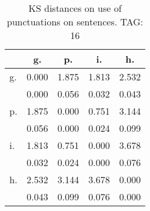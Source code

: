 \begin{table}[h!]
\begin{center}
\begin{tabular}{| l | c | c | c | c |}\hline
 & g. & p. & i. & h. \\\hline
g. & 0.000  & 1.875  & 1.813  & 2.532 \\\hline
 & 0.000  & 0.056  & 0.032  & 0.043 \\\hline
p. & 1.875  & 0.000  & 0.751  & 3.144 \\\hline
 & 0.056  & 0.000  & 0.024  & 0.099 \\\hline
i. & 1.813  & 0.751  & 0.000  & 3.678 \\\hline
 & 0.032  & 0.024  & 0.000  & 0.076 \\\hline
h. & 2.532  & 3.144  & 3.678  & 0.000 \\\hline
 & 0.043  & 0.099  & 0.076  & 0.000 \\\hline
\end{tabular}
\caption{KS distances on use of punctuations on sentences. TAG: 16}
\end{center}
\end{table}